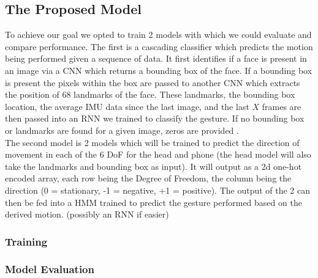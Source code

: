 \subsection{The Proposed Model} %
%
To achieve our goal we opted to train 2 models with which we could evaluate and compare performance.
The first is a cascading classifier which predicts the motion being performed given a sequence of data.
It first identifies if a face is present in an image via a CNN which returns a bounding box of the face\cite{yu2022yunet}. If a bounding box is present the pixels within the box are passed to another CNN which extracts the position of 68 landmarks of the face\cite{guobing2021headpose}.
These landmarks, the bounding box location, the average IMU data since the last image, and the last $X$ frames are then passed into an RNN we trained to classify the gesture.
If no bounding box or landmarks are found for a given image, zeros are provided .
\\
The second model is 2 models which will be trained to predict the direction of movement in each of the 6 DoF for the head and phone (the head model will also take the landmarks and bounding box as input).
It will output as a 2d one-hot encoded array, each row being the Degree of Freedom, the column being the direction (0 = stationary, -1 = negative, +1 = positive).
The output of the 2 can then be fed into a HMM trained to predict the gesture performed based on the derived motion. (possibly an RNN if easier)



\subsubsection{Training}


\subsubsection{Model Evaluation}



